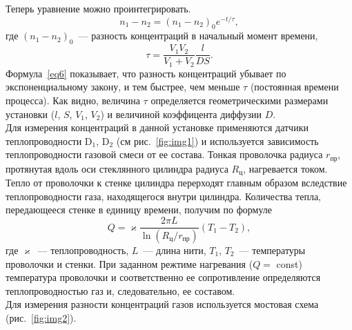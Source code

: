 \documentclass[a4paper,11pt]{article}
\begin{document}
Теперь уравнение можно проинтегрировать.
\begin{equation}\label{eq6}
  n_{1} - n_{2} = \left(n_{1} - n_{2}\right)_{0} e^{-t/\tau},
\end{equation}
где $\left(n_{1} - n_{2}\right)_{0}$~--- разность концентраций в начальный момент времени,
\begin{equation}\label{eq7}
  \tau = \frac{V_{1}V_{2}}{V_{1}+V_{2}}\frac{l}{DS}.
\end{equation}
Формула~\ref{eq6} показывает, что разность концентраций убывает по экспоненциальному закону, и тем быстрее, чем меньше $\tau$ (постоянная времени процесса). Как видно, величина $\tau$ определяется геометрическими размерами установки ($l$, $S$, $V_{1}$, $V_{2}$) и величиной коэффицента диффузии $D$.\\
Для измерения концентраций в данной установке применяются датчики теплопроводности D$_{1}$, D$_{2}$ (см рис.~\ref{fig:img1}) и используется зависимость теплопроводности газовой смеси от ее состава. Тонкая проволочка радиуса $r_{пр}$, протянутая вдоль оси стеклянного цилиндра радиуса $R_{ц}$, нагревается током. Тепло от проволочки к стенке цилиндра перерходят главным образом вследствие теплопроводности газа, находящегося внутри цилиндра. Количества тепла, передающееся стенке в единицу времени, получим по формуле
\begin{equation}\label{eq8}
  Q = \varkappa \frac{2\pi L}{\ln (R_{ц}/r_{пр})}(T_{1} - T_{2}),
\end{equation}
где $\varkappa$~--- теплопроводность, $L$~--- длина нити, $T_{1}$, $T_{2}$~--- температуры проволочки и стенки. При заданном режтиме нагревания ($Q =$ const) температура проволочки и соответственно ее сопротивление определяются теплопроводностью газ и, следовательно, ее составом.\\
Для измерения разности концентраций газов используется мостовая схема (рис.~\ref{fig:img2}).\\
\end{document}
